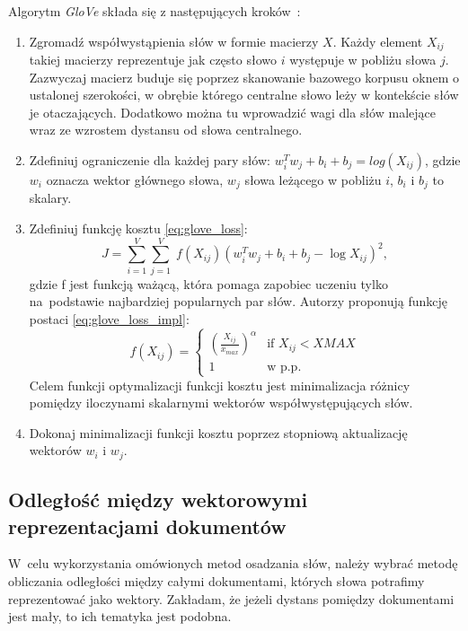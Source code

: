 \documentclass[pl]{minipw} %
\begin{document}
Algorytm \textit{GloVe} składa się z następujących kroków~\cite{glove_cran}:
\begin{enumerate}
	\item Zgromadź współwystąpienia słów w formie macierzy $X$. Każdy element $X_{ij}$ takiej macierzy reprezentuje jak często słowo $i$ występuje w pobliżu słowa $j$. Zazwyczaj macierz buduje się poprzez skanowanie bazowego korpusu oknem o ustalonej szerokości, w obrębie którego centralne słowo leży w kontekście słów je otaczających. Dodatkowo można tu wprowadzić wagi dla słów malejące wraz ze wzrostem dystansu od słowa centralnego.
	\item Zdefiniuj ograniczenie dla każdej pary słów: $w_i^Tw_j + b_i + b_j = log(X_{ij})$, gdzie $w_i$ oznacza wektor głównego słowa, $w_j$ słowa leżącego w pobliżu $i$, $b_i$ i $b_j$ to skalary.
	\item Zdefiniuj funkcję kosztu \ref{eq:glove_loss}:
	\begin{equation}
	\label{eq:glove_loss}
	J = \sum_{i=1}^V \sum_{j=1}^V \; f(X_{ij}) ( w_i^T w_j + b_i + b_j - \log X_{ij})^2,
	\end{equation}
	gdzie f jest funkcją ważącą, która pomaga zapobiec uczeniu tylko na~podstawie najbardziej popularnych par słów. Autorzy proponują funkcję postaci \ref{eq:glove_loss_impl}:
	\begin{equation}
	\label{eq:glove_loss_impl}
	f(X_{ij}) = 
	\begin{cases}
	(\frac{X_{ij}}{x_{max}})^\alpha & \text{if } X_{ij} < XMAX \\
	1 & \text{w p.p.}
	\end{cases}
	\end{equation}
	Celem funkcji optymalizacji funkcji	 kosztu jest minimalizacja różnicy pomiędzy iloczynami skalarnymi wektorów współwystępujących słów.
	\item Dokonaj minimalizacji funkcji kosztu poprzez stopniową aktualizację wektorów $w_i$ i $w_j$.
\end{enumerate}

\subsection{Odległość między wektorowymi reprezentacjami dokumentów}
W~celu wykorzystania omówionych metod osadzania słów, należy wybrać metodę obliczania odległości między całymi dokumentami, których słowa potrafimy reprezentować jako wektory. Zakładam, że jeżeli dystans pomiędzy dokumentami jest mały, to ich tematyka jest podobna.
\end{document}
